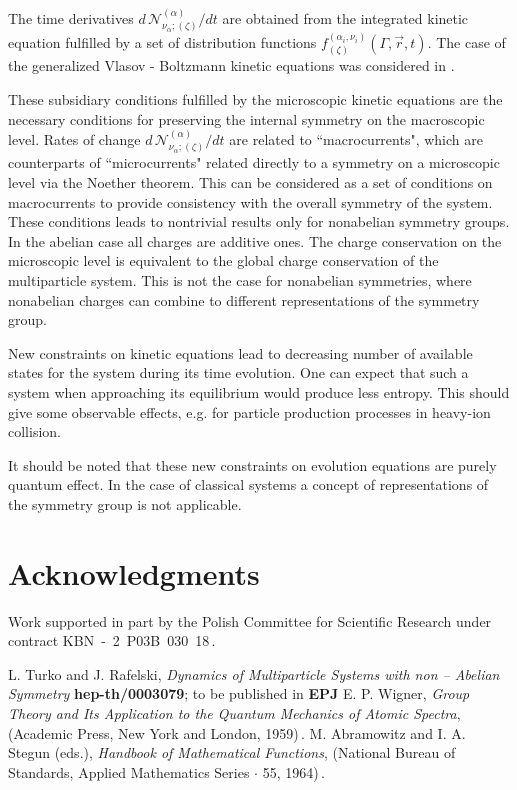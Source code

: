 \documentclass[a4paper]{article}
\begin{document}
The time derivatives ${d\,{\mathcal
N}^{(\alpha)}_{\nu_\alpha;(\zeta)}}/{dt}$ are obtained  from the
integrated kinetic equation fulfilled by a set of distribution
functions $f^{(\alpha_i,\nu_i)}_{(\zeta)}(\Gamma,\vec r,t)$. The
case of the generalized Vlasov - Boltzmann kinetic equations was
considered in \cite{TurRaf}.

These subsidiary conditions fulfilled by the microscopic kinetic
equations are the necessary conditions for preserving the internal
symmetry on the macroscopic level. Rates of change ${d\,{\mathcal
N}^{(\alpha)}_{\nu_\alpha;(\zeta)}}/{dt}$ are related to
``macrocurrents", which are counterparts of ``microcurrents"
related directly to a symmetry on a microscopic level via the
Noether theorem. This can be considered as a set of conditions on
macrocurrents to provide consistency with the overall symmetry of
the system. These conditions leads to nontrivial results only for
nonabelian symmetry groups. In the abelian case all charges are
additive ones. The charge conservation on the microscopic level is
equivalent to the global charge conservation of the multiparticle
system. This is not the case for nonabelian symmetries, where
nonabelian charges can combine to different representations of the
symmetry group.

New constraints on kinetic equations lead to decreasing number of
available states for the system during its time evolution. One can
expect that such a system when approaching its equilibrium would
produce less entropy. This should give some observable effects,
e.g. for particle production processes in heavy-ion collision.

It should be noted that these new constraints on evolution
equations are purely quantum effect. In the case of classical
systems a concept of representations of the symmetry group is not
applicable.

\pagebreak
\section*{Acknowledgments}
Work supported in part by the Polish Committee for Scientific
Research under contract KBN~-~2~P03B~030~18\,.

\begin{thebibliography}{55}
 L. Turko and J. Rafelski, {\it Dynamics of
Multiparticle Systems with non -- Abelian Symmetry} {\bf
hep-th/0003079}; to be published in {\bf EPJ}
E. P. Wigner, {\it Group Theory and Its Application to the Quantum
Mechanics of Atomic Spectra}, (Academic Press, New York and
London, 1959)\,.
 M. Abramowitz and I. A. Stegun (eds.), {\it Handbook of
Mathematical Functions}, (National Bureau of Standards, Applied
Mathematics Series $\cdot$  55, 1964)\,.
\end{thebibliography}
\end{document}
